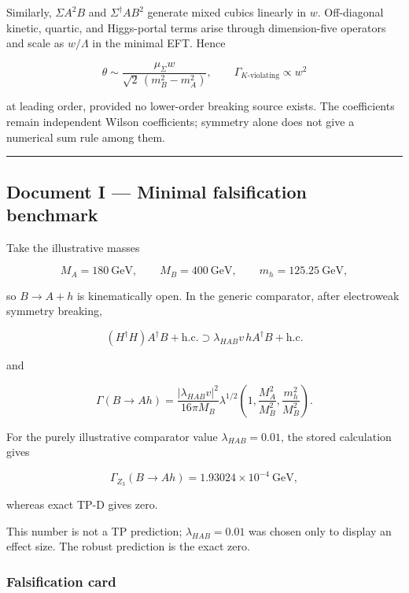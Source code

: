 \documentclass[
]{article}
\begin{document}
Similarly, \(\Sigma A^2B\) and \(\Sigma^\dagger AB^2\) generate mixed
cubics linearly in \(w\). Off-diagonal kinetic, quartic, and
Higgs-portal terms arise through dimension-five operators and scale as
\(w/\Lambda\) in the minimal EFT. Hence

\[
\theta\sim\frac{\mu_\Sigma w}{\sqrt2\,(m_B^2-m_A^2)},
\qquad
\Gamma_{K\text{-violating}}\propto w^2
\]

at leading order, provided no lower-order breaking source exists. The
coefficients remain independent Wilson coefficients; symmetry alone does
not give a numerical sum rule among them.

\begin{center}\rule{0.5\linewidth}{0.5pt}\end{center}

\hypertarget{document-i-minimal-falsification-benchmark}{%
\subsection{Document I --- Minimal falsification
benchmark}\label{document-i-minimal-falsification-benchmark}}

Take the illustrative masses

\[
M_A=180\ \mathrm{GeV},\qquad M_B=400\ \mathrm{GeV},\qquad
m_h=125.25\ \mathrm{GeV},
\]

so \(B\to A+h\) is kinematically open. In the generic comparator, after
electroweak symmetry breaking,

\[
(H^\dagger H)A^\dagger B+\mathrm{h.c.}
\supset \lambda_{HAB}v\,hA^\dagger B+\mathrm{h.c.}
\]

and

\[
\Gamma(B\to Ah)=
\frac{|\lambda_{HAB}v|^2}{16\pi M_B}
\lambda^{1/2}\!\left(1,\frac{M_A^2}{M_B^2},\frac{m_h^2}{M_B^2}\right).
\]

For the purely illustrative comparator value \(\lambda_{HAB}=0.01\), the
stored calculation gives

\[
\Gamma_{Z_3}(B\to Ah)=1.93024\times10^{-4}\ \mathrm{GeV},
\]

whereas exact TP-D gives zero.

This number is not a TP prediction; \(\lambda_{HAB}=0.01\) was chosen
only to display an effect size. The robust prediction is the exact zero.

\hypertarget{falsification-card}{%
\subsubsection{Falsification card}\label{falsification-card}}
\end{document}
